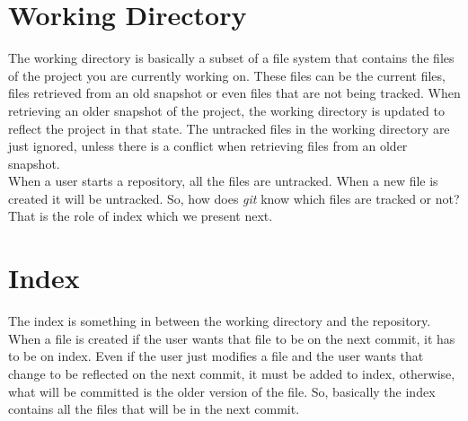 \chapter{Working Directory}

The working directory is basically a subset of
a file system that contains the files of the project you are
currently working on. These files can be the current files, files
retrieved from an old snapshot or even files that are not being
tracked. When retrieving an older snapshot of the project, the
working directory is updated to reflect the project in that state. The
untracked files in the working directory are just ignored, unless
there is a conflict when retrieving files from an older snapshot.\\

When a user starts a repository, all the files are untracked. When a
new file is created it will be untracked. So, how does \emph{git} know which
files are tracked or not? That is the role of index which we present
next.

\chapter{Index}
The index is something in between the working directory and the
repository. When a file is created if the user wants that file to be
on the next commit, it has to be on index. Even if the user just
modifies a file and the user wants that change to be reflected on the
next commit, it must be added to index, otherwise, what will be
committed is the older version of the file. So, basically the index
contains all the files that will be in the next commit.\\

